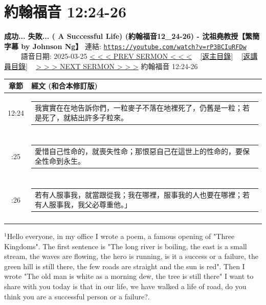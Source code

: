 \documentclass{book}
\begin{document}
\section{約翰福音 12:24-26}
\label{sec:rP3BCIuRFDw}
\textbf{成功... 失敗... ( A Successful Life) (約翰福音12\_24-26) - 沈祖堯教授【繁簡字幕 by Johnson Ng】}
\newline
\newline
連結: \href{https://youtube.com/watch?v=rP3BCIuRFDw}{\texttt{https://youtube.com/watch?v=rP3BCIuRFDw}} ~~~~ 語音日期: 2025-03-25
\newline
\newline
\hyperref[sec:fJrsPMmDHtU]{< < < PREV SERMON < < <}
~
\hyperlink{toc}{[返主目錄]}
~
\hyperref[ch:preacher8]{[返講員目錄]}
~
\hyperref[sec:toZa1ewaUWE]{> > > NEXT SERMON > > >}
\newline
\newline
約翰福音 12:24-26
\newline
\begin{longtable}{cl}
\hline
\hline
章節 & 經文 (和合本修訂版)\\
\hline
12:24 & \begin{tabularx}{0.7\textwidth}{X} 我實實在在地告訴你們，一粒麥子不落在地裡死了，仍舊是一粒；若是死了，就結出許多子粒來。 \end{tabularx} \\ \\ \relax
12:25 & \begin{tabularx}{0.7\textwidth}{X} 愛惜自己性命的，就喪失性命；那恨惡自己在這世上的性命的，要保全性命到永生。 \end{tabularx} \\ \\ \relax
12:26 & \begin{tabularx}{0.7\textwidth}{X} 若有人服事我，就當跟從我；我在哪裡，服事我的人也要在哪裡；若有人服事我，我父必尊重他。」 \end{tabularx} \\ \\
[1ex]
\hline
\hline
\end{longtable}
$^{1}$Hello everyone, in my office I wrote a poem, a famous opening of "Three Kingdoms".
The first sentence is "The long river is boiling, the east is a small stream, the waves are flowing, the hero is running, is it a success or a failure, the green hill is still there, the few roads are straight and the sun is red".
Then I wrote "The old man is white as a morning dew, the tree is still there" I want to share with you today is that in our life, we have walked a life of road, do you think you are a successful person or a failure?.
\end{document}
